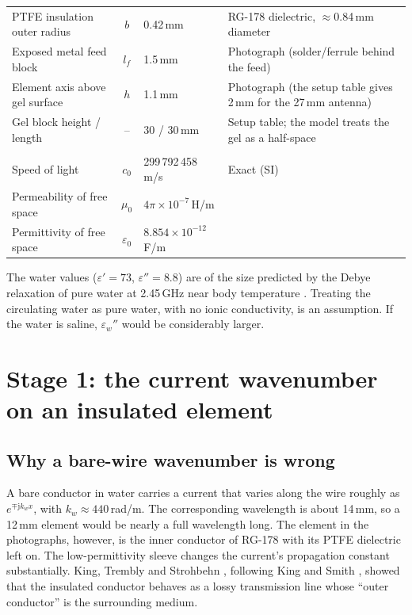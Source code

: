 \documentclass[11pt,a4paper]{article}
\newcommand{\eps}{\varepsilon}
\newcommand{\jj}{\mathrm{j}}
\begin{document}
\begin{table}[tbp]
\begin{tabular}{>{\raggedright}p{4.6cm} c >{\raggedright}p{3.1cm} >{\raggedright\arraybackslash}p{5.2cm}}
PTFE insulation outer radius & $b$ & 0.42\,mm & RG-178 dielectric, $\approx$0.84\,mm diameter \cite{MIL17} \\
Exposed metal feed block & $l_f$ & 1.5\,mm & Photograph (solder/ferrule behind the feed) \\
Element axis above gel surface & $h$ & 1.1\,mm & Photograph (the setup table gives 2\,mm for the 27\,mm antenna) \\
Gel block height / length & -- & 30 / 30\,mm & Setup table; the model treats the gel as a half-space \\
\midrule
\multicolumn{4}{l}{\emph{Physical constants}}\\
Speed of light & $c_0$ & 299\,792\,458\,m/s & Exact (SI) \\
Permeability of free space & $\mu_0$ & $4\pi\times10^{-7}$\,H/m & \\
Permittivity of free space & $\eps_0$ & $8.854\times10^{-12}$\,F/m & \\
\bottomrule
\end{tabular}
\end{table}

The water values ($\eps'=73$, $\eps''=8.8$) are of the size predicted by the Debye relaxation of pure water
at 2.45\,GHz near body temperature \cite{Kaatze1989}. Treating the circulating water as pure water, with no
ionic conductivity, is an assumption. If the water is saline, $\eps_w''$ would be considerably larger.

\section{Stage 1: the current wavenumber on an insulated element}\label{sec:kL}

\subsection{Why a bare-wire wavenumber is wrong}

A bare conductor in water carries a current that varies along the wire roughly as $e^{\mp\jj k_w x}$, with
$k_w\approx 440$\,rad/m. The corresponding wavelength is about 14\,mm, so a 12\,mm element would be nearly a full
wavelength long. The element in the photographs, however, is the inner conductor of RG-178 with its PTFE
dielectric left on. The low-permittivity sleeve changes the current's propagation constant substantially.
King, Trembly and Strohbehn \cite{King1983}, following King and Smith \cite{KingSmith1981}, showed that the
insulated conductor behaves as a lossy transmission line whose ``outer conductor'' is the surrounding
medium.
\end{document}
